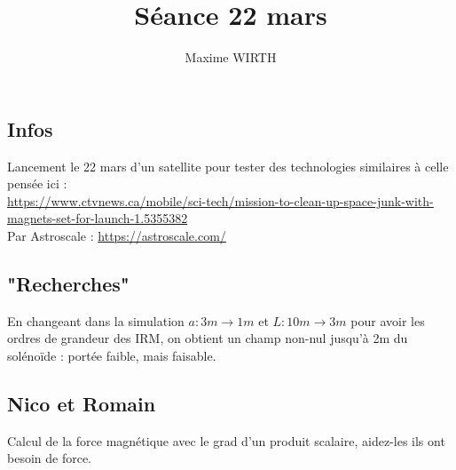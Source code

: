 \documentclass{article}
\author{Maxime WIRTH}
\title{Séance 22 mars}
\begin{document}
\maketitle

\subsection{Infos}

Lancement le 22 mars d'un satellite pour tester des technologies similaires à celle pensée ici :\\
\url{https://www.ctvnews.ca/mobile/sci-tech/mission-to-clean-up-space-junk-with-magnets-set-for-launch-1.5355382}\\
Par Astroscale : \url{https://astroscale.com/}

\subsection{"Recherches"}

En changeant dans la simulation $ a : 3m \rightarrow 1m $ et $ L : 10m \rightarrow 3m $ pour avoir les ordres de grandeur des IRM, on obtient
un champ non-nul jusqu'à 2m du solénoïde : portée faible, mais faisable.

\subsection{Nico et Romain}

Calcul de la force magnétique avec le grad d'un produit scalaire, aidez-les ils ont besoin de force.
\end{document}
